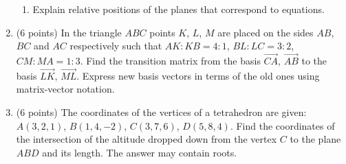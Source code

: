 \documentclass[]{exam}
\begin{document}
\begin{enumerate}
\begin{enumerate}
\item Explain relative positions of the planes that correspond to equations.
\end{enumerate} 






\item (6 points)  
In the triangle $ABC$ points $K$, $L$, $M$ are placed on the sides $AB$, $BC$ and $AC$ respectively such that $AK : KB = 4 : 1$, $BL : LC = 3 : 2$, $CM : MA = 1 : 3$. Find the transition matrix from the basis $\overrightarrow{CA}$, $\overrightarrow{AB}$ to the basis $\overrightarrow{LK}$, $\overrightarrow{ML}$. Express new basis vectors in terms of the old ones using matrix-vector notation.





\item (6 points)  The coordinates of the vertices of a tetrahedron are given: $A(3,2,1)$, $B(1,4,-2)$, $C(3,7,6)$, $D(5,8,4)$. Find the coordinates of the intersection of the altitude dropped down from the vertex $C$ to the plane $ABD$ and its length. The answer may contain roots. 


\end{enumerate}
\end{document}
